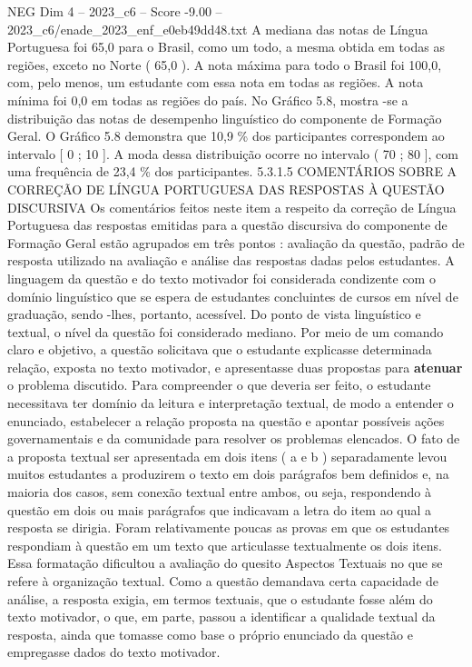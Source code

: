 \begin{textsample}{NEG Dim 4 – 2023\_c6 – Score -9.00 – 2023\_c6/enade\_2023\_enf\_e0eb49dd48.txt}
A mediana das notas de Língua Portuguesa foi 65,0 para o Brasil, como um todo, a mesma obtida em todas as regiões, exceto no Norte ( 65,0 ).
A nota máxima para todo o Brasil foi 100,0, com, pelo menos, um estudante com essa nota em todas as regiões.
A nota mínima foi 0,0 em todas as regiões do país.
No Gráfico 5.8, mostra -se a distribuição das notas de desempenho linguístico do componente de Formação Geral.
O Gráfico 5.8 demonstra que 10,9 \% dos participantes correspondem ao intervalo [ 0 ; 10 ].
A moda dessa distribuição ocorre no intervalo ( 70 ; 80 ], com uma frequência de 23,4 \% dos participantes. 5.3.1.5 COMENTÁRIOS SOBRE A CORREÇÃO DE LÍNGUA PORTUGUESA DAS RESPOSTAS À QUESTÃO DISCURSIVA Os comentários feitos neste item a respeito da correção de Língua Portuguesa das respostas emitidas para a questão discursiva do componente de Formação Geral estão agrupados em três pontos : avaliação da questão, padrão de resposta utilizado na avaliação e análise das respostas dadas pelos estudantes.
A linguagem da questão e do texto motivador foi considerada condizente com o domínio linguístico que se espera de estudantes concluintes de cursos em nível de graduação, sendo -lhes, portanto, acessível.
Do ponto de vista linguístico e textual, o nível da questão foi considerado mediano.
Por meio de um comando claro e objetivo, a questão solicitava que o estudante explicasse determinada relação, exposta no texto motivador, e apresentasse duas propostas para \textbf{atenuar} o problema discutido.
Para compreender o que deveria ser feito, o estudante necessitava ter domínio da leitura e interpretação textual, de modo a entender o enunciado, estabelecer a relação proposta na questão e apontar possíveis ações governamentais e da comunidade para resolver os problemas elencados.
O fato de a proposta textual ser apresentada em dois itens ( a e b ) separadamente levou muitos estudantes a produzirem o texto em dois parágrafos bem definidos e, na maioria dos casos, sem conexão textual entre ambos, ou seja, respondendo à questão em dois ou mais parágrafos que indicavam a letra do item ao qual a resposta se dirigia.
Foram relativamente poucas as provas em que os estudantes respondiam à questão em um texto que articulasse textualmente os dois itens.
Essa formatação dificultou a avaliação do quesito Aspectos Textuais no que se refere à organização textual.
Como a questão demandava certa capacidade de análise, a resposta exigia, em termos textuais, que o estudante fosse além do texto motivador, o que, em parte, passou a identificar a qualidade textual da resposta, ainda que tomasse como base o próprio enunciado da questão e empregasse dados do texto motivador.

\end{textsample}
